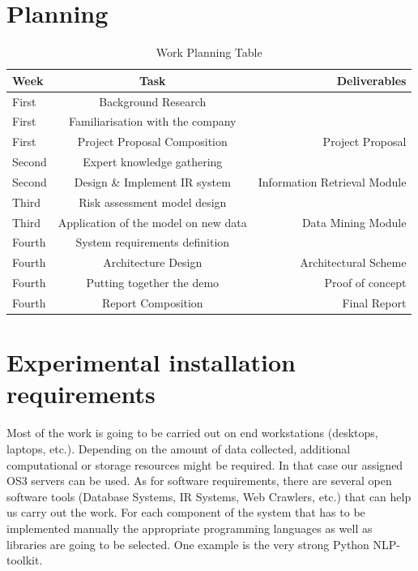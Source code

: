 \documentclass[12pt]{article}
\begin{document}
\section{Planning}

\begin {table}[!h]
\begin{tabular}[!h]{|l|c|r|}
\hline
Week & Task & Deliverables\\
\hline
First & Background Research&\\
\hline
First &  Familiarisation with the company&\\
\hline
First & Project Proposal Composition&Project Proposal\\
\hline
Second & Expert knowledge gathering&\\
\hline
Second &Design \& Implement IR system& Information Retrieval Module\\
\hline
Third & Risk assessment model design&\\
\hline
Third & Application of the model on new data& Data Mining Module\\
\hline
Fourth & System requirements definition& \\ 
\hline
Fourth & Architecture Design& Architectural Scheme\\ 
\hline
Fourth & Putting together the demo & Proof of concept\\ 
\hline
Fourth & Report Composition & Final Report\\ 
\hline
\end{tabular}
\caption {Work Planning Table} 
\end{table}

\section{Experimental installation requirements}
\parbox{\linewidth}{
Most of the work is going to be carried out on end workstations (desktops, laptops, etc.). Depending on the amount of data collected, additional computational or storage resources might be required. In that case our assigned OS3 servers can be used. As for software requirements, there are several open software tools (Database Systems, IR Systems, Web Crawlers, etc.) that can help us carry out the work. For each component of the system that has to be implemented manually the appropriate programming languages as well as libraries are going to be selected. One example is the very strong Python NLP-toolkit.\cite{nltk} }
\end{document}
